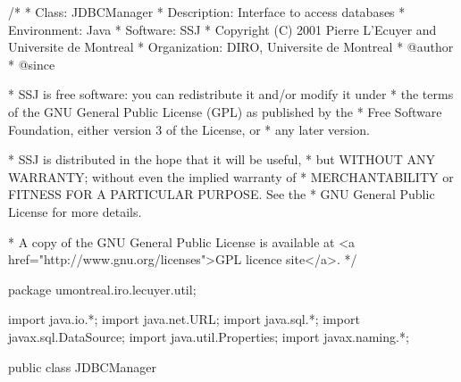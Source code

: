 \begin{code}\begin{hide}
/*
 * Class:        JDBCManager
 * Description:  Interface to access databases
 * Environment:  Java
 * Software:     SSJ 
 * Copyright (C) 2001  Pierre L'Ecuyer and Universite de Montreal
 * Organization: DIRO, Universite de Montreal
 * @author       
 * @since

 * SSJ is free software: you can redistribute it and/or modify it under
 * the terms of the GNU General Public License (GPL) as published by the
 * Free Software Foundation, either version 3 of the License, or
 * any later version.

 * SSJ is distributed in the hope that it will be useful,
 * but WITHOUT ANY WARRANTY; without even the implied warranty of
 * MERCHANTABILITY or FITNESS FOR A PARTICULAR PURPOSE.  See the
 * GNU General Public License for more details.

 * A copy of the GNU General Public License is available at
   <a href="http://www.gnu.org/licenses">GPL licence site</a>.
 */
\end{hide}
package umontreal.iro.lecuyer.util;
\begin{hide}
import java.io.*;
import java.net.URL;
import java.sql.*;
import javax.sql.DataSource;
import java.util.Properties;
import javax.naming.*;
\end{hide}

public class JDBCManager\begin{hide} {
\end{hide}\end{code}
